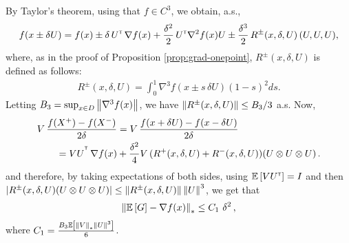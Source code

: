 By Taylor's theorem, using that $f\in C^3$, we obtain, a.s.,
\begin{align*}
f(x \pm \delta U) =
 f(x)
 \pm\delta\,  U^\mathsf{\scriptscriptstyle T}\,\nabla f(x)
  + \frac{\delta^2}{2}\, U^\mathsf{\scriptscriptstyle T} \nabla^2 f(x) U
  \pm  \frac{\delta^3}{2} \, R^{\pm}(x,\delta,U) \,(U, U, U),
\end{align*}
where, as in the proof of Proposition \ref{prop:grad-onepoint}, $R^{\pm}(x,\delta,U)$ is defined as follows:
\begin{align}
 R^{\pm}(x,\delta,U)= \int_0^1  \nabla^3 f(  x \pm s \, \delta U ) (1-s)^2 ds. \label{eq:taylor-r}
\end{align}
Letting $B_3 = \sup_{x\in D} \left\| \nabla^3 f(x) \right\|$,%
we have $\left\| R^{\pm}(x,\delta,U)\right\| \le B_3/3$ a.s.
Now,
\begin{align}
\begin{split}
\MoveEqLeft       V\, \dfrac{f(X^+)-f(X^-)}{2\delta}
  = V\, \dfrac{f(x+\delta U) - f(x-\delta U)}{2\delta} \\
&= VU^{\tr}
\, \nabla f(x)   +   \frac{\delta^2}{4}  V \,(R^{+}(x,\delta,U)+R^{-}(x,\delta,U))(U \otimes U \otimes U)\,.
\end{split}
\label{eq:l1}
\end{align}
and therefore,
by taking expectations of both sides,
using $\mathbb{E}\left[V U^\mathsf{\scriptscriptstyle T}\right] = I$ and then $|R^{\pm}(x,\delta,U) (U \otimes U \otimes U)| \le
\left\|R^{\pm}(x,\delta,U)\right\| \left\|U\right\|^3$,
we get that
\begin{align*}
\left\| \mathbb{E}\left[ G \right] - \nabla f(x) \right\|_*
\le C_1\,\, \delta^2 \,,
\end{align*}
where $C_1 = \frac{B_3 \mathbb{E}\left[ \left\|V\right\|_* \left\|U\right\|^3 \right]}{6}$.

